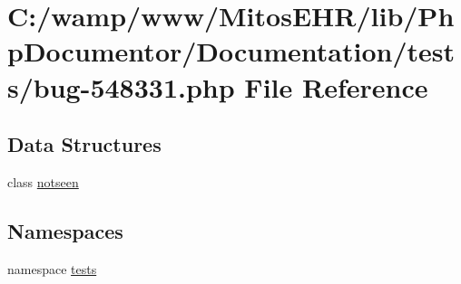 \hypertarget{bug-548331_8php}{\section{\-C\-:/wamp/www/\-Mitos\-E\-H\-R/lib/\-Php\-Documentor/\-Documentation/tests/bug-\/548331.php \-File \-Reference}
\label{bug-548331_8php}
}
\subsection*{\-Data \-Structures}
\begin{DoxyCompactItemize}
\item 
class \hyperlink{classnotseen}{notseen}
\end{DoxyCompactItemize}
\subsection*{\-Namespaces}
\begin{DoxyCompactItemize}
\item 
namespace \hyperlink{namespacetests}{tests}
\end{DoxyCompactItemize}

